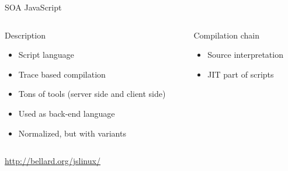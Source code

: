 %
\begin{Frame}{SOA JavaScript}
  \begin{columns}[t]
    \begin{column}{\HW} %
      \begin{block}{Description}
        \begin{itemize}
        \item Script language
        \item Trace based compilation
        \item Tons of tools (server side and client side)
        \item Used as back-end language
        \item Normalized, but with variants
        \end{itemize}
      \end{block} 
    \end{column}
    
    \begin{column}{\HW} %
      \begin{block}{Compilation chain}
        \begin{itemize}
        \item Source interpretation
        \item JIT part of scripts 
        \end{itemize}
      \end{block}   
    \end{column}
  \end{columns}
   
\url{http://bellard.org/jslinux/}

\end{Frame}


